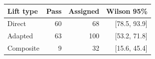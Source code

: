 \begin{tabular}{lrrr}
\toprule
\textbf{Lift type} & \textbf{Pass} & \textbf{Assigned} & \textbf{Wilson 95\%} \\
\midrule
Direct & 60 & 68 & [78.5, 93.9] \\
Adapted & 63 & 100 & [53.2, 71.8] \\
Composite & 9 & 32 & [15.6, 45.4] \\
\bottomrule
\end{tabular}
